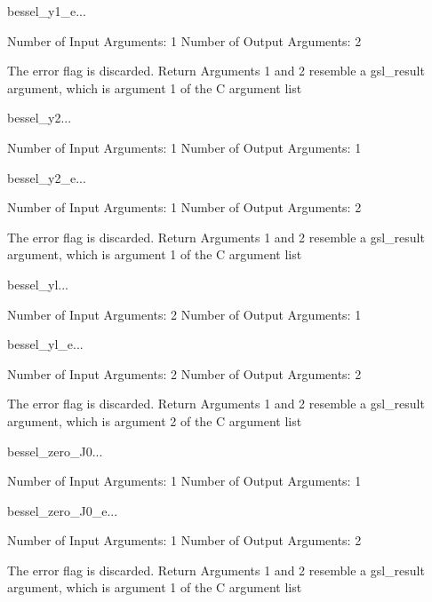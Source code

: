 \begin{funcdesc}{bessel_y1_e}{...}

    Number of Input  Arguments:  1
    Number of Output Arguments:  2

The error flag is discarded.
Return Arguments 1 and 2 resemble a gsl_result argument,
	which is  argument 1 of the C argument list

\end{funcdesc}

\begin{funcdesc}{bessel_y2}{...}

    Number of Input  Arguments:  1
    Number of Output Arguments:  1
\end{funcdesc}

\begin{funcdesc}{bessel_y2_e}{...}

    Number of Input  Arguments:  1
    Number of Output Arguments:  2

The error flag is discarded.
Return Arguments 1 and 2 resemble a gsl_result argument,
	which is  argument 1 of the C argument list

\end{funcdesc}

\begin{funcdesc}{bessel_yl}{...}

    Number of Input  Arguments:  2
    Number of Output Arguments:  1
\end{funcdesc}

\begin{funcdesc}{bessel_yl_e}{...}

    Number of Input  Arguments:  2
    Number of Output Arguments:  2

The error flag is discarded.
Return Arguments 1 and 2 resemble a gsl_result argument,
	which is  argument 2 of the C argument list

\end{funcdesc}

\begin{funcdesc}{bessel_zero_J0}{...}

    Number of Input  Arguments:  1
    Number of Output Arguments:  1
\end{funcdesc}

\begin{funcdesc}{bessel_zero_J0_e}{...}

    Number of Input  Arguments:  1
    Number of Output Arguments:  2

The error flag is discarded.
Return Arguments 1 and 2 resemble a gsl_result argument,
	which is  argument 1 of the C argument list

\end{funcdesc}

